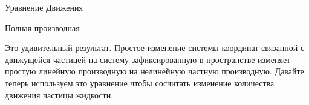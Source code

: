 \begin{chapter}{Уравнение Движения}
\begin{section}{Полная производная}

Это удивительный результат. Простое изменение системы координат
связанной с движущейся частицей на систему зафиксированную в
пространстве изменяет простую линейную производную на нелинейную
частную производную. Давайте теперь используем это уравнение чтобы
сосчитать изменение количества движения частицы жидкости.
%
\end{section}


\end{chapter}
